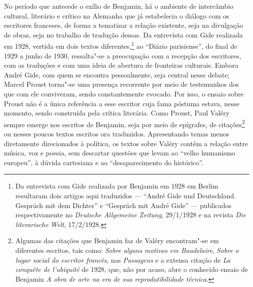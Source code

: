 No período que antecede o exílio de Benjamin, há o ambiente de
intercâmbio cultural, literário e crítico na Alemanha que já estabelecia
o diálogo com os escritores franceses, de forma a tematizar a relação
existente, seja na divulgação de obras, seja no trabalho de tradução
dessas. Da entrevista com Gide realizada em 1928, vertida em dois textos
diferentes,\footnote{Da entrevista com Gide realizada por Benjamin em
  1928 em Berlim resultaram dois artigos aqui traduzidos --- ``André Gide
  und Deutschland. Gespräch mit dem Dichter'' e ``Gespräch mit André
  Gide'' --- publicados respectivamente no \emph{Deutsche Allgemeine
  Zeitung}, 29/1/1928 e na revista \emph{Die literarische Welt},
  17/2/1928.} ao ``Diário parisiense'', do final de 1929 a junho de 1930, ressalta"-se a preocupação com a recepção dos escritores, com as traduções e com uma
ideia de abertura de fronteiras culturais. Embora André Gide, com quem se encontra
pessoalmente, seja central nesse debate, Marcel Proust torna"-se uma presença
recorrente por meio de testemunhos dos que com ele conviveram, sendo
constantemente evocado. Por isso, o ensaio sobre Proust não é a única
referência a esse escritor cuja fama póstuma estava, nesse momento,
sendo construída pela crítica literária.
Como Proust, Paul Valéry sempre emerge nos escritos de Benjamin, seja
por meio de epígrafes, de citações\footnote{Algumas das citações que Benjamin faz de Valéry encontram"-se em diferentes escritos, tais como: \emph{Sobre alguns motivos em Baudelaire}, \emph{Sobre o lugar social do escritor francês}, nas \emph{Passagens} e a extensa citação de \emph{La conquête de l'ubiquité} de 1928, que, não por acaso, abre o conhecido ensaio de Benjamin \emph{A obra de arte na era de sua reprodutibilidade técnica}.} ou nesses poucos textos escritos ora
traduzidos. Apresentando temas menos diretamente direcionados à política, os textos sobre Valéry contêm a relação entre música, voz e poesia, sem descartar questões que levam ao ``velho humanismo europeu'', à dúvida cartesiana e ao ``desaparecimento do histórico''.

